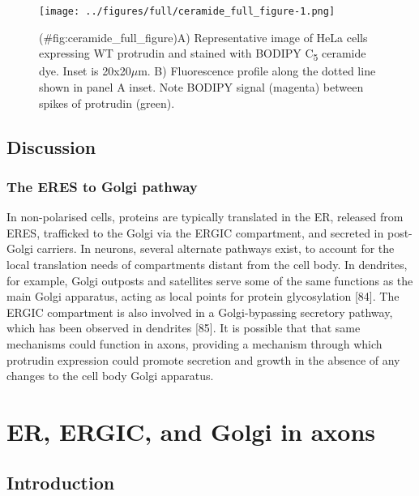 \documentclass[
  12pt,
  a4paper,
]{book}
\begin{document}
\begin{figure}
\centering
\texttt{[image: ../figures/full/ceramide\_full\_figure-1.png]}
\caption{(\#fig:ceramide\_full\_figure)A) Representative image of HeLa cells expressing WT protrudin and stained with BODIPY C\textsubscript{5} ceramide dye. Inset is 20x20\(\mu\)m. B) Fluorescence profile along the dotted line shown in panel A inset. Note BODIPY signal (magenta) between spikes of protrudin (green).}
\end{figure}

\hypertarget{discussion}{%
\section{Discussion}\label{discussion}}

\hypertarget{the-eres-to-golgi-pathway}{%
\subsection{The ERES to Golgi pathway}\label{the-eres-to-golgi-pathway}}

In non-polarised cells, proteins are typically translated in the ER, released from ERES, trafficked to the Golgi via the ERGIC compartment, and secreted in post-Golgi carriers. In neurons, several alternate pathways exist, to account for the local translation needs of compartments distant from the cell body. In dendrites, for example, Golgi outposts and satellites serve some of the same functions as the main Golgi apparatus, acting as local points for protein glycosylation {[}84{]}. The ERGIC compartment is also involved in a Golgi-bypassing secretory pathway, which has been observed in dendrites {[}85{]}. It is possible that that same mechanisms could function in axons, providing a mechanism through which protrudin expression could promote secretion and growth in the absence of any changes to the cell body Golgi apparatus.

\hypertarget{er-ergic-and-golgi-in-axons}{%
\chapter{ER, ERGIC, and Golgi in axons}\label{er-ergic-and-golgi-in-axons}}

\hypertarget{introduction-2}{%
\section{Introduction}\label{introduction-2}}
\end{document}
